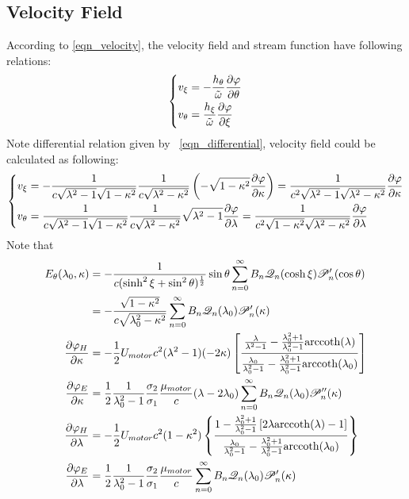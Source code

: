 \documentclass[fontsize=11pt, %
                             paper=a4, %
                             twoside, %
                             captions=tableheading,
                             index=totoc,
                             hyperref]{labbook}
\begin{document}
\subsection{Velocity Field}
According to \ref{eqn_velocity}, the velocity field and stream function have following relations:
\begin{equation}
\left\{
\begin{aligned}
v_{\xi}&=-\frac{h_\theta}{\tilde{\omega}}\frac{\partial \varphi}{\partial \theta}\\
v_{\theta}&=\frac{h_\xi}{\tilde\omega}\frac{\partial \varphi}{\partial \xi}
\end{aligned}
\right.
\end{equation}
Note differential relation given by ~\ref{eqn_differential}, velocity field could be calculated as following:
\begin{equation}
\left\{
\begin{aligned}
v_{\xi}&=-\frac{1}{c\sqrt{\lambda^2-1}\sqrt{1-\kappa^2}}\frac{1}{c\sqrt{\lambda^2-\kappa^2}}\left(-\sqrt{1-\kappa^2}\frac{\partial \varphi}{\partial \kappa}\right)=\frac{1}{c^2\sqrt{\lambda^2-1}\sqrt{\lambda^2-\kappa^2}}\frac{\partial \varphi}{\partial \kappa}\\
v_{\theta}&=\frac{1}{c\sqrt{\lambda^2-1}\sqrt{1-\kappa^2}}\frac{1}{c\sqrt{\lambda^2-\kappa^2}}\sqrt{\lambda^2-1}\frac{\partial \varphi}{\partial \lambda}=\frac{1}{c^2\sqrt{1-\kappa^2}\sqrt{\lambda^2-\kappa^2}}\frac{\partial \varphi}{\partial \lambda}
\end{aligned}
\right.
\end{equation}
Note that
\begin{equation}\label{eqn-1st}
\begin{aligned}
E_\theta(\lambda_0,\kappa)&=-\frac{1}{c(\sinh^2\xi+\sin^2\theta)^{\frac{1}{2}}}\sin\theta\sum_{n=0}^\infty B_n\mathscr{Q}_n(\cosh\xi)\mathscr{P}_n^\prime(\cos\theta)\\
&=-\frac{\sqrt{1-\kappa^2}}{c\sqrt{\lambda_0^2-\kappa^2}}\sum_{n=0}^\infty B_n\mathscr{Q}_n(\lambda_0)\mathscr{P}_n^\prime(\kappa)\\
\frac{\partial \varphi_H}{\partial \kappa}&=-\frac{1}{2}U_{motor}c^2(\lambda^2-1)(-2\kappa)\left[\frac{\frac{\lambda}{\lambda^2-1}-\frac{\lambda_0^2+1}{\lambda_0^2-1}\mathrm{arccoth}(\lambda)}{\frac{\lambda_0}{\lambda_0^2-1}-\frac{\lambda_0^2+1}{\lambda_0^2-1}\mathrm{arccoth}(\lambda_0)}\right]\\
\frac{\partial \varphi_E}{\partial \kappa}&=\frac{1}{2}\frac{1}{\lambda_0^2-1}\frac{\sigma_2}{\sigma_1}\frac{\mu_{motor}}{c}(\lambda-2\lambda_0)\sum_{n=0}^\infty B_n\mathscr{Q}_n(\lambda_0)\mathscr{P}_n^{\prime\prime}(\kappa)\\
\frac{\partial \varphi_H}{\partial \lambda}&=-\frac{1}{2}U_{motor}c^2(1-\kappa^2)\left\{\frac{1-\frac{\lambda_0^2+1}{\lambda_0^2-1}\left[2\lambda\mathrm{arccoth}(\lambda)-1\right]}{\frac{\lambda_0}{\lambda_0^2-1}-\frac{\lambda_0^2+1}{\lambda_0^2-1}\mathrm{arccoth}(\lambda_0)}\right\}\\
\frac{\partial \varphi_E}{\partial \lambda}&=\frac{1}{2}\frac{1}{\lambda_0^2-1}\frac{\sigma_2}{\sigma_1}\frac{\mu_{motor}}{c}\sum_{n=0}^\infty B_n \mathscr{Q}_n(\lambda_0)\mathscr{P}_n^\prime(\kappa)
\end{aligned}
\end{equation}
\end{document}
